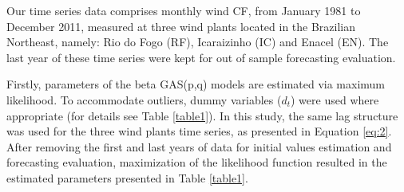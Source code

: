\documentclass[a4paper]{IEEEtran}
\begin{document}
Our time series data comprises monthly wind CF, from January 1981 to December 2011, measured at three wind plants located in the Brazilian Northeast, namely: Rio do Fogo (RF), Icaraizinho (IC) and Enacel (EN). The last year of these time series were kept for out of sample forecasting evaluation.

Firstly, parameters of the beta GAS(p,q) models are estimated via maximum likelihood. To accommodate outliers, dummy variables ($d_{t}$) were used where appropriate (for details see Table \ref{table1}). In this study, the same lag structure was used for the three wind plants time series, as presented in Equation \eqref{eq:2}. After removing the first and last years of data for initial values estimation and forecasting evaluation,  maximization of the likelihood function resulted in the estimated parameters presented in Table \ref{table1}. 
\end{document}
